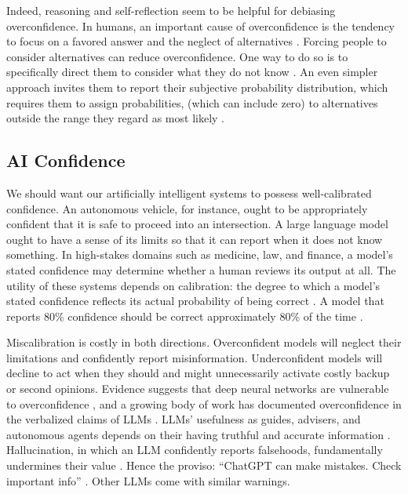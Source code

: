 \documentclass{article}
\begin{document}
Indeed, reasoning and self-reflection seem to be helpful for debiasing overconfidence. In humans, an important cause of overconfidence is the tendency to focus on a favored answer and the neglect of alternatives \citep{Augenblick2026,Juslin_2007,Soll_2024}. Forcing people to consider alternatives can reduce overconfidence. One way to do so is to specifically direct them to consider what they do not know \citep{Walters_2017}. An even simpler approach invites them to report their subjective probability distribution, which requires them to assign probabilities, (which can include zero) to alternatives outside the range they regard as most likely \citep{Goldstein_Rothschild_2014}.  

\subsection{AI Confidence}
We should want our artificially intelligent systems to possess well-calibrated confidence. An autonomous vehicle, for instance, ought to be appropriately confident that it is safe to proceed into an intersection. A large language model ought to have a sense of its limits so that it can report when it does not know something. In high-stakes domains such as medicine, law, and finance, a model's stated confidence may determine whether a human reviews its output at all. The utility of these systems depends on calibration: the degree to which a model's stated confidence reflects its actual probability of being correct \citep{Dawid01091982, guo2017calibrationmodernneuralnetworks}. A model that reports 80\% confidence should be correct approximately 80\% of the time \citep{Xiong_2024}.

Miscalibration is costly in both directions. Overconfident models will neglect their limitations and confidently report misinformation. Underconfident models will decline to act when they should and might unnecessarily activate costly backup or second opinions. Evidence suggests that deep neural networks are vulnerable to overconfidence \citep{guo2017calibrationmodernneuralnetworks, Oelrich_2020, Abdar_2021}, and a growing body of work has documented overconfidence in the verbalized claims of LLMs \citep{Tian2023Calibration, yang2024verbalizedconfidencescoresllms, Xu2025, Tripathi2025}. LLMs' usefulness as guides, advisers, and autonomous agents depends on their having truthful and accurate information \citep{Afroogh2024}. Hallucination, in which an LLM confidently reports falsehoods, fundamentally undermines their value \citep{kalai2025languagemodelshallucinate}. Hence the proviso: ``ChatGPT can make mistakes. Check important info'' \citep{gpt_o3}. Other LLMs come with similar warnings. 
\end{document}

